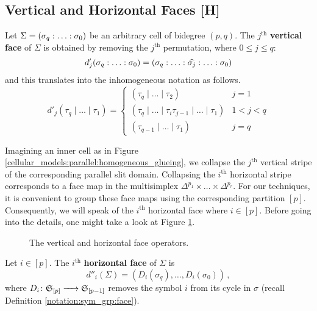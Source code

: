 \subsection{Vertical and Horizontal Faces [H]}
\label{cellular_models:parallel:faces}

\begin{defi}
\label{cellular_models:parallel:dv}
Let $\Sigma = \homogq$ be an arbitrary cell of bidegree $(p,q)$.
The $j^{\text{th}}$ {\bf vertical face} of $\Sigma$ is obtained by removing the $j^{\text{th}}$ permutation, where $0 \le j \le q$:
\[
    d'_j \homogq = (\sigma_q: \ldots: \widehat{\sigma_j}: \ldots: \sigma_0)
\]
and this translates into the inhomogeneous notation as follows.
\[
    d'_j(\tau_q \mid \ldots \mid \tau_1) =
        \begin{cases}
            (\tau_q \mid \ldots \mid \tau_2) & j = 1 \\
            (\tau_q \mid \ldots \mid \tau_i \tau_{j-1} \mid \ldots \mid \tau_1) & 1 < j < q \\
            (\tau_{q-1} \mid \ldots \mid \tau_1) & j = q
        \end{cases}
\]
\end{defi}

Imagining an inner cell as in Figure \ref{cellular_models:parallel:homogeneous_glueing}, we collapse the $j^{\text{th}}$ vertical stripe of the corresponding parallel slit domain.
Collapsing the $i^{\text{th}}$ horizontal stripe corresponds to a face map in the multisimplex $\Delta^{p_1} \times \ldots \times \Delta^{p_r}$.
For our techniques, it is convenient to group these face maps using the corresponding partition $[p]$.
Consequently, we will speak of the $i^{\text{th}}$ horizontal face where $i \in [p]$.
Before going into the details, one might take a look at Figure \ref{cellular_models:parallel:comparison_face_operators}.
\begin{figure}[ht]
\centering
{}
\caption{\label{cellular_models:parallel:comparison_face_operators}The vertical and horizontal face operators.}
\end{figure}

\begin{defi}
\label{cellular_models:parallel:dh}
Let $i \in [p]$.
The $i^{\text{th}}$ {\bf horizontal face} of $\Sigma$ is
\[ 
    d''_i(\Sigma) = (D_i(\sigma_q), \dotsc, D_i(\sigma_0))\,,
\]
where $D_i \colon \mathfrak S_{[p]} \xrightarrow{\hspace{6pt}{}\hspace{6pt}} \mathfrak S_{[p-1]}$ removes the symbol $i$ from its cycle in $\sigma$ (recall Definition \ref{notation:sym_grp:face}).
\end{defi}

